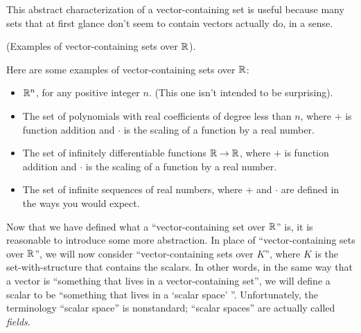 This abstract characterization of a vector-containing set is useful because many sets that at first glance don't seem to contain vectors actually do, in a sense.

\begin{remark}
    (Examples of vector-containing sets over $\mathbb{R}$).
    
    Here are some examples of vector-containing sets over $\mathbb{R}$:
    
    \begin{itemize}
        \item $\mathbb{R}^n$, for any positive integer $n$. (This one isn't intended to be surprising).
        \item The set of polynomials with real coefficients of degree less than $n$, where $+$ is function addition and $\cdot$ is the scaling of a function by a real number.
        \item The set of infinitely differentiable functions $\mathbb{R} \rightarrow \mathbb{R}$, where $+$ is function addition and $\cdot$ is the scaling of a function by a real number.
        \item The set of infinite sequences of real numbers, where $+$ and $\cdot$ are defined in the ways you would expect.
    \end{itemize}
\end{remark}

Now that we have defined what a ``vector-containing set over $\mathbb{R}$'' is, it is reasonable to introduce some more abstraction. In place of ``vector-containing sets over $\mathbb{R}$'', we will now consider ``vector-containing sets over $K$'', where $K$ is the set-with-structure that contains the scalars. In other words, in the same way that a vector is ``something that lives in a vector-containing set'', we will define a scalar to be ``something that lives in a `scalar space' ''.  Unfortunately, the terminology ``scalar space'' is nonstandard;  ``scalar spaces'' are actually called \textit{fields}.

\newpage


